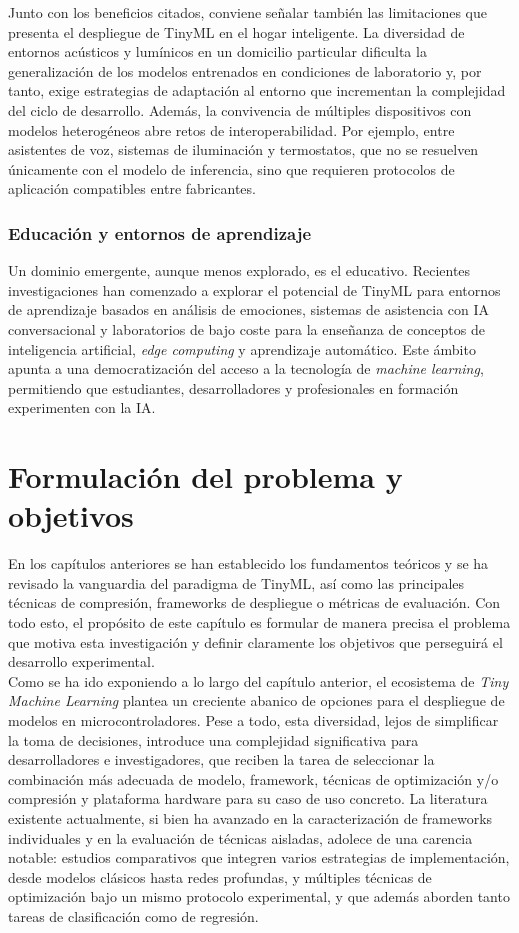 \documentclass[a4paper,12pt,twoside,final]{book}
\begin{document}
Junto con los beneficios citados, conviene señalar también las limitaciones que presenta el despliegue de TinyML en
el hogar inteligente. La diversidad de entornos acústicos y lumínicos en un domicilio particular dificulta la
generalización de los modelos entrenados en condiciones de laboratorio y, por tanto, exige estrategias de adaptación
al entorno que incrementan la complejidad del ciclo de desarrollo. Además, la convivencia de múltiples dispositivos
con modelos heterogéneos abre retos de interoperabilidad. Por ejemplo, entre asistentes de voz, sistemas de
iluminación y termostatos, que no se resuelven únicamente con el modelo de inferencia, sino que requieren protocolos
de aplicación compatibles entre fabricantes.

\subsection{Educación y entornos de aprendizaje}
Un dominio emergente, aunque menos explorado, es el educativo. Recientes investigaciones han comenzado a explorar el
potencial de TinyML para entornos de aprendizaje basados en análisis de emociones, sistemas de asistencia con IA
conversacional y laboratorios de bajo coste para la enseñanza de conceptos de inteligencia artificial,
\textit{edge computing} y aprendizaje automático. Este ámbito apunta a una democratización del acceso a la tecnología
de \textit{machine learning}, permitiendo que estudiantes, desarrolladores y profesionales en formación
experimenten con la IA.


\chapter{Formulación del problema y objetivos}\label{chap:objetivos}
En los capítulos anteriores se han establecido los fundamentos teóricos y se ha revisado la vanguardia del paradigma
de TinyML, así como las principales técnicas de compresión, frameworks de despliegue o métricas de evaluación. Con
todo esto, el propósito de este capítulo es formular de manera precisa el problema que motiva esta investigación y
definir claramente los objetivos que perseguirá el desarrollo experimental.\\

Como se ha ido exponiendo a lo largo del capítulo anterior, el ecosistema de \textit{Tiny Machine Learning} plantea
un creciente abanico de opciones para el despliegue de modelos en microcontroladores. Pese a todo, esta diversidad,
lejos de simplificar la toma de decisiones, introduce una complejidad significativa para desarrolladores e
investigadores, que reciben la tarea de seleccionar la combinación más adecuada de modelo, framework, técnicas de
optimización y/o compresión y plataforma hardware para su caso de uso concreto. La literatura existente actualmente, si
bien ha avanzado en la caracterización de frameworks individuales y en la evaluación de técnicas aisladas, adolece de
una carencia notable: estudios comparativos que integren varios estrategias de implementación, desde modelos clásicos
hasta redes profundas, y múltiples técnicas de optimización bajo un mismo protocolo experimental, y que además aborden
tanto tareas de clasificación como de regresión.\\
\end{document}
